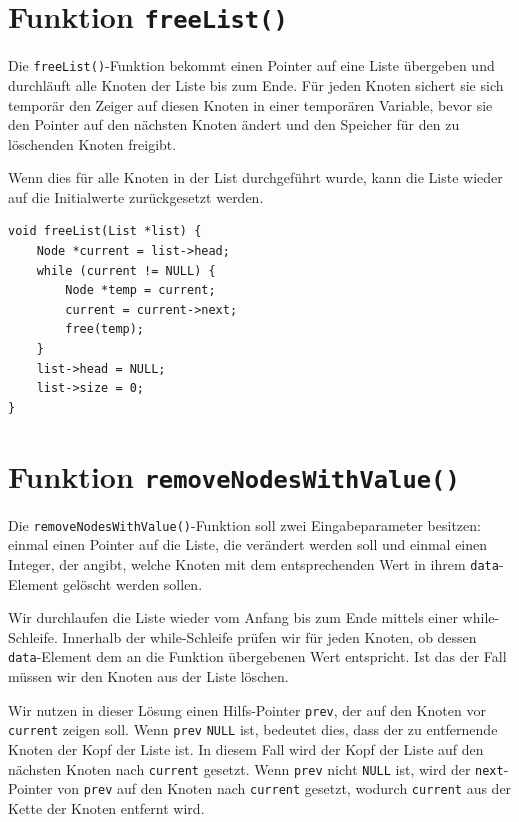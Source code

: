 \section*{Funktion \texttt{freeList()}}

Die \texttt{freeList()}-Funktion bekommt einen Pointer auf eine Liste
übergeben und durchläuft alle Knoten der Liste bis zum Ende. Für jeden Knoten
sichert sie sich temporär den Zeiger auf diesen Knoten in einer temporären
Variable, bevor sie den Pointer auf den nächsten Knoten ändert und den Speicher
für den zu löschenden Knoten freigibt.

Wenn dies für alle Knoten in der List durchgeführt wurde, kann die Liste wieder
auf die Initialwerte zurückgesetzt werden.

\begin{verbatim}
void freeList(List *list) {
    Node *current = list->head;
    while (current != NULL) {
        Node *temp = current;
        current = current->next;
        free(temp);
    }
    list->head = NULL;
    list->size = 0;
}
\end{verbatim}

\section*{Funktion \texttt{removeNodesWithValue()}}

Die \texttt{removeNodesWithValue()}-Funktion soll zwei Eingabeparameter
besitzen: einmal einen Pointer auf die Liste, die verändert werden soll und
einmal einen Integer, der angibt, welche Knoten mit dem entsprechenden Wert in
ihrem \texttt{data}-Element gelöscht werden sollen.

Wir durchlaufen die Liste wieder vom Anfang bis zum Ende mittels einer
while-Schleife. Innerhalb der while-Schleife prüfen wir für jeden Knoten, ob
dessen \texttt{data}-Element dem an die Funktion übergebenen Wert
entspricht. Ist das der Fall müssen wir den Knoten aus der Liste löschen.

Wir nutzen in dieser Lösung einen Hilfs-Pointer \texttt{prev}, der auf
den Knoten vor \texttt{current} zeigen soll. Wenn \texttt{prev}
\texttt{NULL} ist, bedeutet dies, dass der zu entfernende Knoten der Kopf
der Liste ist. In diesem Fall wird der Kopf der Liste auf den nächsten Knoten
nach \texttt{current} gesetzt. Wenn \texttt{prev} nicht
\texttt{NULL} ist, wird der \texttt{next}-Pointer von
\texttt{prev} auf den Knoten nach \texttt{current} gesetzt,
wodurch \texttt{current} aus der Kette der Knoten entfernt wird.

